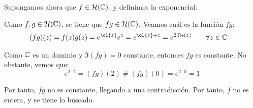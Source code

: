 \begin{ejercicio}
    Supongamos ahora que $f\in \mathcal{H}(\mathbb{C})$, y definimos la exponencial:

    Como $f,g\in \mathcal{H}(\mathbb{C})$, se tiene que $fg\in \mathcal{H}(\mathbb{C})$. Veamos cuál es la función $fg$:
    \begin{align*}
        (fg)(z)=f(z)g(z) &= e^{\ol{z}}e^z = e^{\ol{z}+z} = e^{2\Re(z)}\qquad \forall z\in \bb{C}
    \end{align*}

    Como $\mathbb{C}$ es un dominio y $\Im(fg)=0$ constante, entonces $fg$ es constante. No obstante, vemos que:
    \begin{equation*}
        e^{2\cdot 2}=(fg)(2)\neq (fg)(0) = e^{2\cdot 0} = 1
    \end{equation*}

    Por tanto, $fg$ no es constante, llegando a una contradicción. Por tanto, $f$ no es entera, y se tiene lo buscado.
\end{ejercicio}

